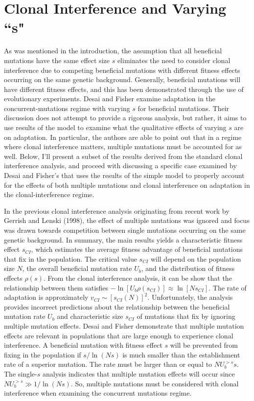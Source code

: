 \documentclass[12pt, one column]{article}
\begin{document}
\section*{Clonal Interference and Varying ``s"}
As was mentioned in the introduction, the assumption that all beneficial mutations have the same effect size $s$ eliminates the need to consider clonal interference due to competing beneficial mutations with different fitness effects occurring on the same genetic background.  Generally, beneficial mutations will have different fitness effects, and this has been demonstrated through the use of evolutionary experiments.  Desai and Fisher examine adaptation in the concurrent-mutations regime with varying $s$ for beneficial mutations.  Their discussion does not attempt to provide a rigorous analysis, but rather, it aims to use results of the model to examine what the qualitative effects of varying $s$ are on adaptation.  In particular, the authors are able to point out that in a regime where clonal interference matters, multiple mutations must be accounted for as well.  Below, I'll present a subset of the results derived from the standard clonal interference analysis, and proceed with discussing a specific case examined by Desai and Fisher's that uses the results of the simple model to properly account for the effects of both multiple mutations and clonal interference on adaptation in the clonal-interference regime.

In the previous clonal interference analysis originating from recent work by Gerrish and Lenski (1998), the effect of multiple mutations was ignored and focus was drawn towards competition between single mutations occurring on the same genetic background.  In summary, the main results yields a characteristic fitness effect $s_{CI}$, which estimates the average fitness advantage of beneficial mutations that fix in the population.  The critical value $s_{CI}$ will depend on the population size $N$, the overall beneficial mutation rate $U_b$, and the distribution of fitness effects $\rho(s)$.  From the clonal interference analysis, it can be show that the relationship between them satisfies $-\ln[U_b \rho(s_{CI})] \approx \ln[N s_{CI}]$.  The rate of adaptation is approximately $v_{CI} \sim [s_{CI}(N)]^2$.  Unfortunately, the analysis provides incorrect predictions about the relationship between the beneficial mutation rate $U_b$ and characteristic size $s_{CI}$ of mutations that fix by ignoring multiple mutation effects.  Desai and Fisher demonstrate that multiple mutation effects are relevant in populations that are large enough to experience clonal interference.  A beneficial mutation with fitness effect $s$ will be prevented from fixing in the population if $s/\ln(Ns)$ is much smaller than the establishment rate of a superior mutation.  The rate must be larger than or equal to $NU_b^{>s}s$.  The single-$s$ analysis indicates that multiple mutation effects will occur since $NU_b^{>s} \gg 1/\ln(Ns)$.  So, multiple mutations must be considered with clonal interference when examining the concurrent mutations regime.
\end{document}
